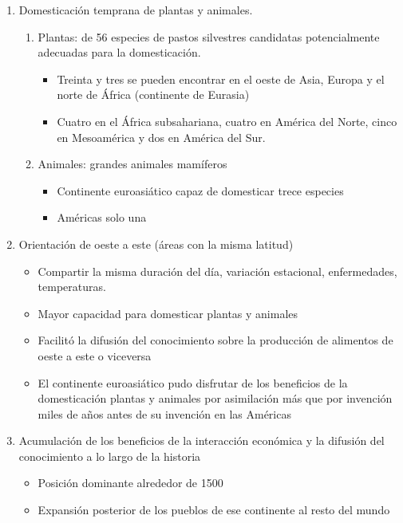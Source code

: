 \begin{enumerate}
    \item Domesticación temprana de plantas y animales.
	\begin{enumerate}
	    \item Plantas: de 56 especies de pastos silvestres candidatas potencialmente adecuadas para la domesticación.
		\begin{itemize}
		    \item Treinta y tres se pueden encontrar en el oeste de Asia, Europa y el norte de África (continente de Eurasia) 
		    \item Cuatro en el África subsahariana, cuatro en América del Norte, cinco en Mesoamérica y dos en América del Sur.
		\end{itemize}
	    \item Animales: grandes animales mamíferos
		\begin{itemize}
		    \item Continente euroasiático capaz de domesticar trece especies
		    \item  Américas solo una
		\end{itemize}
	\end{enumerate}
    \item Orientación de oeste a este (áreas con la misma latitud)
	\begin{itemize}
	    \item Compartir la misma duración del día, variación estacional, enfermedades, temperaturas.
	    \item Mayor capacidad para domesticar plantas y animales 
	    \item Facilitó la difusión del conocimiento sobre la producción de alimentos de oeste a este o viceversa 
	    \item El continente euroasiático pudo disfrutar de los beneficios de la domesticación plantas y animales por asimilación más que por invención miles de años antes de su invención en las Américas
	\end{itemize}

    \item Acumulación de los beneficios de la interacción económica y la difusión del conocimiento a lo largo de la historia
	\begin{itemize}
	    \item Posición dominante alrededor de 1500 
	    \item Expansión posterior de los pueblos de ese continente al resto del mundo
	\end{itemize}
\end{enumerate}


